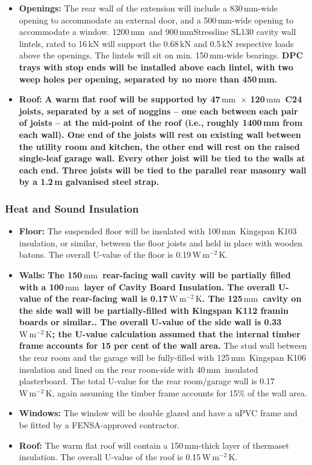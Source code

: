 \documentclass{extension}
\newcommand{\mm}{\,$\mathrm{mm}$}
\newcommand{\uunit}{\,$\mathrm{W\,m^{-2}\,K}$}
\begin{document}
\begin{itemize}
  \item {\bf Openings:} The rear wall of the extension will include a 830\mm -wide opening to accommodate an external door, and a 500\mm -wide opening to accommodate a window. 1200\mm\ and 900\mm Stressline SL130 cavity wall lintels\cite{esteel}, rated to 16\,kN will support the 0.68\,kN and 0.5\,kN respective loads above the openings. The lintels will sit on min. 150\mm -wide bearings. {\bf DPC trays with stop ends will be installed above each lintel, with two weep holes per opening, separated by no more than 450\,mm.}
  \item {\bf Roof:} {\bf A warm flat roof will be supported by 47\mm\ $\times$ 120\mm\ C24 joists, separated by a set of noggins -- one each between each pair of joists -- at the mid-point of the roof (i.e., roughly 1400\,mm from each wall). One end of the joists will rest on existing wall between the utility room and kitchen, the other end will rest on the raised single-leaf garage wall. Every other joist will be tied to the walls at each end. Three joists will be tied to the parallel rear masonry wall by a 1.2\,m galvanised steel strap.}
\end{itemize}

\subsubsection{Heat and Sound Insulation}
\begin{itemize}
  \item {\bf Floor:} The suspended floor will be insulated with 100\mm\ Kingspan K103 insulation, or similar, between the floor joists and held in place with wooden batons. The overall U-value of the floor is 0.19\uunit .
  \item {\bf Walls:} {\bf The 150\mm\ rear-facing wall cavity will be partially filled with a 100\mm\ layer of Cavity Board Insulation.\cite{uw1ins} The overall U-value of the rear-facing wall is 0.17\uunit . The 125\mm\ cavity on the side wall will be partially-filled with Kingspan K112 framin boards or similar.\cite{uw2ins}. The overall U-value of the side wall is 0.33\uunit ; the U-value calculation assumed that the internal timber frame accounts for 15 per cent of the wall area.} The stud wall between the rear room and the garage will be fully-filled with 125\mm\ Kingspan K106\cite{uw3ins} insulation and lined on the rear room-side with 40\mm\ insulated plasterboard.\cite{uw4ins} The total U-value for the rear room/garage wall is 0.17\uunit , again assuming the timber frame accounts for 15\% of the wall area.
  \item {\bf Windows:} The window will be double glazed and have a uPVC frame and be fitted by a FENSA-approved contractor.
  \item {\bf Roof:} The warm flat roof will contain a 150\mm -thick layer of thermaset insulation.\cite{erins} The overall U-value of the roof is 0.15\uunit .
\end{itemize}
\end{document}
